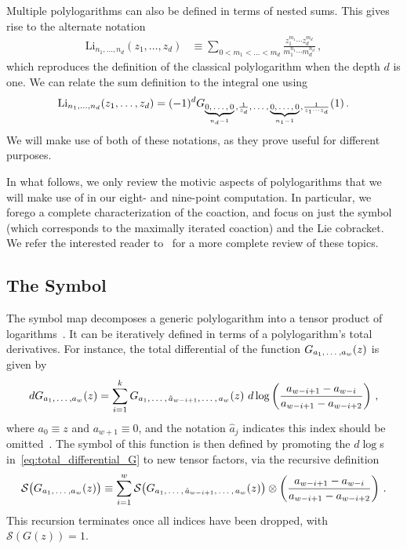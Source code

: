 \documentclass[11pt]{article}
\newcommand{\fwboxL}[2]{\text{\makebox[#1][l]{$#2$}}}
\begin{document}
Multiple polylogarithms can also be defined in terms of nested sums. This gives rise to the alternate notation
\begin{align} \label{eq:Li_notation}
\text{Li}_{n_1,\dots,n_d}(z_1,\dots, z_d) &\equiv \sum_{0 < m_1 < \dots < m_d} \frac{z_1^{m_1} \cdots z_d^{m_d}}{m_1^{n_1} \cdots m_d^{n_d}} \, ,
\end{align}
which reproduces the definition of the classical polylogarithm when the depth $d$ is one. We can relate the sum definition to the integral one using
\begin{align}
\text{Li}_{n_1,\dots,n_d}(z_1,\dots, z_d) = (-1)^d G_{\fwboxL{28pt}{\underbrace{0,\dots,0}_{n_d-1}},\frac{1}{z_d},\fwboxL{13pt}{\,\dots},\fwboxL{29pt}{\,\underbrace{0,\dots,0}_{n_1-1}},\frac{1}{z_1 \cdots z_d}}(1) \, .
\end{align}
We will make use of both of these notations, as they prove useful for different purposes. 

In what follows, we only review the motivic aspects of polylogarithms that we will make use of in our eight- and nine-point computation. In particular, we forego a complete characterization of the coaction, and focus on just the symbol (which corresponds to the maximally iterated coaction) and the Lie cobracket. We refer the interested reader to~\cite{Duhr:2014woa} for a more complete review of these topics.

\subsection{The Symbol}

The symbol map decomposes a generic polylogarithm into a tensor product of logarithms~\cite{Goncharov:2010jf}. It can be iteratively defined in terms of a polylogarithm's total derivatives. For instance, the total differential of the function $G_{a_1, \fwboxL{13pt}{\,\dots}, a_w}(z)$ is given by
\begin{equation} \label{eq:total_differential_G}
d G_{a_1, \fwboxL{13pt}{\,\dots}, a_w}(z) = \sum_{i=1}^{k} G_{a_1,\fwboxL{13pt}{\,\dots},\,\hat{a}_{w-i+1},\fwboxL{13pt}{\,\dots},\,a_w}(z) \ d\log \left( \frac{a_{w-i+1} - a_{w-i}}{a_{w-i+1} - a_{w-i+2}} \right)\, ,
\end{equation} 
where $a_0 \equiv z$ and $a_{w+1} \equiv 0$, and the notation $\hat{a}_{j}$ indicates this index should be omitted~\cite{GoncharovMixedTate,Duhr:2011zq}. The symbol of this function is then defined by promoting the $d\log$s in~\eqref{eq:total_differential_G} to new tensor factors, via the recursive definition  
\begin{equation} \label{eq:symbol_def}
\mathcal{S}\big(G_{a_1, \fwboxL{13pt}{\,\dots}, a_w}(z)\big) \equiv \sum_{i=1}^{w} \mathcal{S}\big(G_{a_1,\fwboxL{13pt}{\,\dots},\,\hat{a}_{w-i+1},\fwboxL{13pt}{\,\dots},\,a_w}(z) \big) \otimes \left( \frac{a_{w-i+1} - a_{w-i}}{a_{w-i+1} - a_{w-i+2}} \right)\, .
\end{equation} 
This recursion terminates once all indices have been dropped, with $\mathcal{S}(G(z)) = 1$.
\end{document}
